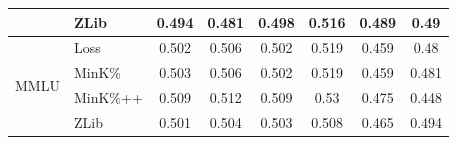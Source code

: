 \begin{table}[tb]
\begin{tabular}{clcccccc}
                                     & ZLib                                                        &   0.494       &   0.481      &  0.498       &   0.516       &   0.489       &  0.49           \\ \midrule
\multirow{4}{*}{MMLU}                & Loss                                                        &   0.502       &   0.506      &  0.502       &   0.519       &   0.459       &  0.48           \\  
                                     & MinK\%                                                      &   0.503       &   0.506      &  0.502       &   0.519       &   0.459       &  0.481           \\  
                                     & MinK\%++                                                    &   0.509       &   0.512      &  0.509       &   0.53       &   0.475       &  0.448           \\  
                                     & ZLib                                                        &   0.501       &   0.504      &  0.503       &   0.508       &   0.465       &  0.494           \\ \bottomrule
\end{tabular}
\end{table}